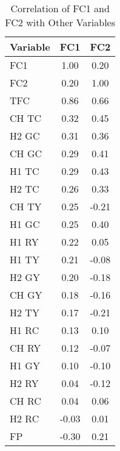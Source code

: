 \begin{table}[!ht]
\centering
\caption{Correlation of FC1 and FC2 with Other Variables}
\label{correlation table}
\begin{tabular}{|l|c|c|}
\hline
\textbf{Variable} & \textbf{FC1} & \textbf{FC2} \\
\hline
FC1      & 1.00 & 0.20 \\
FC2      & 0.20 & 1.00 \\
TFC      & 0.86 & 0.66 \\
CH TC    & 0.32 & 0.45 \\
H2 GC    & 0.31 & 0.36 \\
CH GC    & 0.29 & 0.41 \\
H1 TC    & 0.29 & 0.43 \\
H2 TC    & 0.26 & 0.33 \\
CH TY    & 0.25 & -0.21 \\
H1 GC    & 0.25 & 0.40 \\
H1 RY    & 0.22 & 0.05 \\
H1 TY    & 0.21 & -0.08 \\
H2 GY    & 0.20 & -0.18 \\
CH GY    & 0.18 & -0.16 \\
H2 TY    & 0.17 & -0.21 \\
H1 RC    & 0.13 & 0.10 \\
CH RY    & 0.12 & -0.07 \\
H1 GY    & 0.10 & -0.10 \\
H2 RY    & 0.04 & -0.12 \\
CH RC    & 0.04 & 0.06 \\
H2 RC    & -0.03 & 0.01 \\
FP       & -0.30 & 0.21 \\
\hline
\end{tabular}
\end{table}
